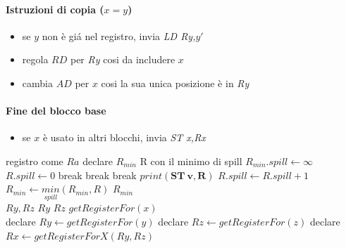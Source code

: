 \paragraph{Istruzioni di copia ($x=y$)}
\begin{itemize}
\item se $y$ non \`e gi\'a nel registro, invia \textit{LD Ry,$y'$}
\item regola $RD$ per \textit{Ry} cosi da includere $x$
\item cambia $AD$ per $x$ cosi la sua unica posizione \`e in \textit{Ry}
\end{itemize}

\paragraph{Fine del blocco base}
\begin{itemize}
\item se $x$ \`e usato in altri blocchi, invia \textit{ST x,Rx}
\end{itemize}

\begin{algorithm}[H]
\caption{$getReg=(x:=y \ OP \ z)$}
\label{alg:gerReg}
\begin{algorithmic}
   \Comment registro come $Ra$
\Else
  \State declare $R_{min}$ \Comment R con il minimo di spill
  \State $R_{min}.spill \leftarrow \infty$
    \State $R.spill \leftarrow 0$
        break
        break
        break
      \Else
        \State $print(\mathbf{ST \ v,R})$
        \State $R.spill \leftarrow R.spill + 1$
      \EndIf
    \EndFor
    \State $R_{min} \leftarrow \underset{spill}{min}(R_{min},R)$
  \EndFor
  \State \Return $R_{min}$
\EndIf
\EndFunction
\\
 {$Ry,Rz$}
  \State \Return $Ry$
  \State \Return $Rz$
\Else
  \State \Return $getRegisterFor(x)$
\EndIf
\EndFunction
\\
\State declare $Ry \leftarrow getRegisterFor(y)$
\State declare $Rz \leftarrow getRegisterFor(z)$
\State declare $Rx \leftarrow getRegisterForX(Ry,Rz)$
\end{algorithmic}
\end{algorithm}

